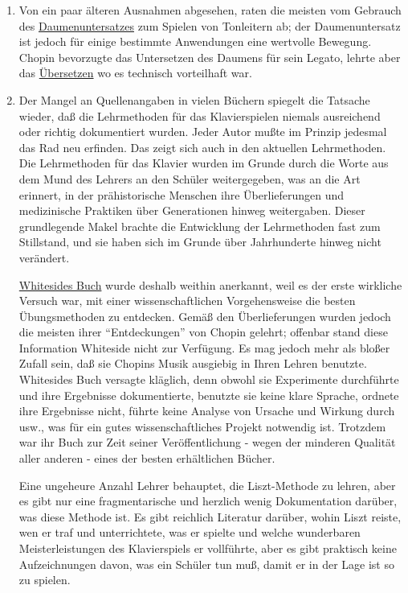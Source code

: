 \begin{enumerate}[label={\arabic*.}]
\item Von ein paar älteren Ausnahmen abgesehen, raten die meisten vom Gebrauch des \hyperref[c1iii5a]{Daumenuntersatzes} zum Spielen von Tonleitern ab; der Daumenuntersatz ist jedoch für einige bestimmte Anwendungen eine wertvolle Bewegung.
Chopin bevorzugte das Untersetzen des Daumens für sein Legato, lehrte aber das \hyperref[c1iii5a2]{Übersetzen} wo es technisch vorteilhaft war.

\item Der Mangel an Quellenangaben in vielen Büchern spiegelt die Tatsache wieder, daß die Lehrmethoden für das Klavierspielen niemals ausreichend oder richtig dokumentiert wurden.
Jeder Autor mußte im Prinzip jedesmal das Rad neu erfinden.
Das zeigt sich auch in den aktuellen Lehrmethoden.
Die Lehrmethoden für das Klavier wurden im Grunde durch die Worte aus dem Mund des Lehrers an den Schüler weitergegeben, was an die Art erinnert, in der prähistorische Menschen ihre Überlieferungen und medizinische Praktiken über Generationen hinweg weitergaben.
Dieser grundlegende Makel brachte die Entwicklung der Lehrmethoden fast zum Stillstand, und sie haben sich im Grunde über Jahrhunderte hinweg nicht verändert.

\hyperref[Whiteside]{Whitesides Buch} wurde deshalb weithin anerkannt, weil es der erste wirkliche Versuch war, mit einer wissenschaftlichen Vorgehensweise die besten Übungsmethoden zu entdecken.
Gemäß den Überlieferungen wurden jedoch die meisten ihrer \enquote{Entdeckungen} von Chopin gelehrt; offenbar stand diese Information Whiteside nicht zur Verfügung.
Es mag jedoch mehr als bloßer Zufall sein, daß sie Chopins Musik ausgiebig in Ihren Lehren benutzte.
Whitesides Buch versagte kläglich, denn obwohl sie Experimente durchführte und ihre Ergebnisse dokumentierte, benutzte sie keine klare Sprache, ordnete ihre Ergebnisse nicht, führte keine Analyse von Ursache und Wirkung durch usw., was für ein gutes wissenschaftliches Projekt notwendig ist.
Trotzdem war ihr Buch zur Zeit seiner Veröffentlichung - wegen der minderen Qualität aller anderen - eines der besten erhältlichen Bücher.

Eine ungeheure Anzahl Lehrer behauptet, die Liszt-Methode zu lehren, aber es gibt nur eine fragmentarische und herzlich wenig Dokumentation darüber, was diese Methode ist.
Es gibt reichlich Literatur darüber, wohin Liszt reiste, wen er traf und unterrichtete, was er spielte und welche wunderbaren Meisterleistungen des Klavierspiels er vollführte, aber es gibt praktisch keine Aufzeichnungen davon, was ein Schüler tun muß, damit er in der Lage ist so zu spielen.


\end{enumerate}

